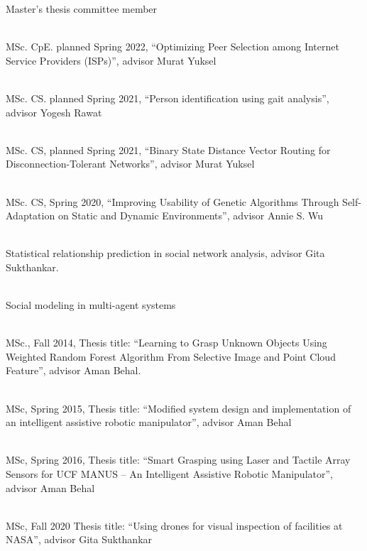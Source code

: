 %
%

\begin{category}{Master's thesis committee member}

\\
MSc. CpE. planned Spring 2022, ``Optimizing Peer Selection among Internet Service Providers (ISPs)'', advisor Murat Yuksel

\\
MSc. CS. planned Spring 2021, ``Person identification using gait analysis'', advisor Yogesh Rawat

\\
MSc. CS, planned Spring 2021, ``Binary State Distance Vector Routing for Disconnection-Tolerant Networks'', advisor Murat Yuksel

\\
MSc. CS, Spring 2020, ``Improving Usability of Genetic Algorithms Through Self-Adaptation on Static and Dynamic Environments'', advisor Annie S. Wu

\\
Statistical relationship prediction in social network analysis, advisor Gita Sukthankar.

\\
Social modeling in multi-agent systems


\\
MSc., Fall 2014, Thesis title: ``Learning to Grasp Unknown Objects Using Weighted Random Forest Algorithm From Selective Image and Point Cloud Feature'', advisor Aman Behal.

 \\
MSc, Spring 2015, Thesis title: ``Modified system design and implementation of an intelligent assistive robotic manipulator'', advisor Aman Behal

 \\
MSc, Spring 2016, Thesis title: ``Smart Grasping using Laser and Tactile Array Sensors for UCF MANUS   – An Intelligent Assistive Robotic Manipulator'', advisor Aman Behal

 \\
MSc, Fall 2020 Thesis title: ``Using drones for visual inspection of facilities at NASA'', advisor Gita Sukthankar


\end{category}

